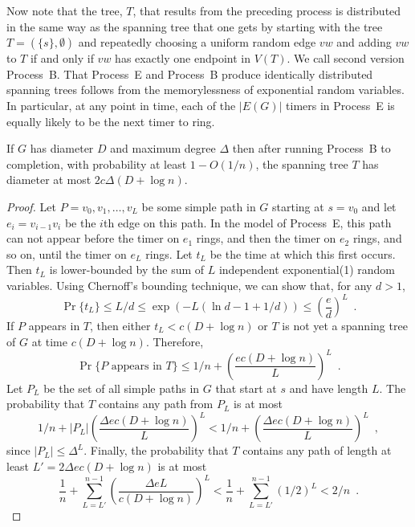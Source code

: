 \documentclass{patmorin}
\begin{document}
Now note that the tree, $T$, that results from the preceding process
is distributed in the same way as the spanning tree that one gets by
starting with the tree $T=(\{s\},\emptyset)$ and repeatedly choosing
a uniform random edge $vw$ and adding $vw$ to $T$ if and only if $vw$
has exactly one endpoint in $V(T)$.  We call second version Process~B.
That Process~E and Process~B produce identically distributed spanning
trees follows from the memorylessness of exponential random variables.
In particular, at any point in time, each of the $|E(G)|$ timers in
Process~E is equally likely to be the next timer to ring.

\begin{lem}
  If $G$ has diameter $D$ and maximum degree $\Delta$ then after running
  Process~B to completion, with probability at least $1-O(1/n)$, the spanning
  tree $T$ has diameter at most $2c\Delta(D+\log n)$.
\end{lem}

\begin{proof}
  Let $P=v_0,v_1,\ldots,v_L$ be some simple path in $G$ starting at
  $s=v_0$ and let $e_i=v_{i-1}v_i$ be the $i$th edge on this path.
  In the model of Process~E, this path can not appear before the timer
  on $e_1$ rings, and then the timer on $e_2$ rings, and so on, until the
  timer on $e_L$ rings.  Let $t_L$ be the time at which this first occurs.
  Then $t_L$ is lower-bounded by the sum of $L$ independent exponential(1)
  random variables.  Using Chernoff's bounding technique, we can show that,
  for any $d > 1$,
  \[
      \Pr\{t_L\} \le L/d \le \exp(-L(\ln d - 1+1/d)) \le \left(\frac{e}{d}\right)^L \enspace .
  \]
  If $P$ appears in $T$, then either $t_L < c(D+\log n)$ or $T$ is not
  yet a spanning tree of $G$ at time $c(D+\log n)$.  
  Therefore, 
  \[
      \Pr\{\text{$P$ appears in $T$}\} \le 1/n 
        + \left(\frac{ec(D+\log n)}{L}\right)^L \enspace .
  \]
  Let $P_L$ be the set of all simple paths in $G$ that start at $s$ and have length $L$.  The probability that $T$ contains any path from $P_L$ is at most
  \[
      1/n + |P_L|\left(\frac{\Delta ec(D+\log n)}{L}\right)^L 
      < 1/n + \left(\frac{\Delta ec(D+\log n)}{L}\right)^L \enspace ,
  \]
  since $|P_L|\le \Delta^L$.
  Finally, the probability that $T$ contains any path of length at least
  $L'=2\Delta ec(D+\log n)$ is at most
  \[
     \frac{1}{n}+\sum_{L=L'}^{n-1} \left(\frac{\Delta e L}{c(D+\log n)}\right)^L <  \frac{1}{n}+\sum_{L=L'}^{n-1} (1/2)^L < 2/n \enspace . 
  \]
\end{proof}
\end{document}
